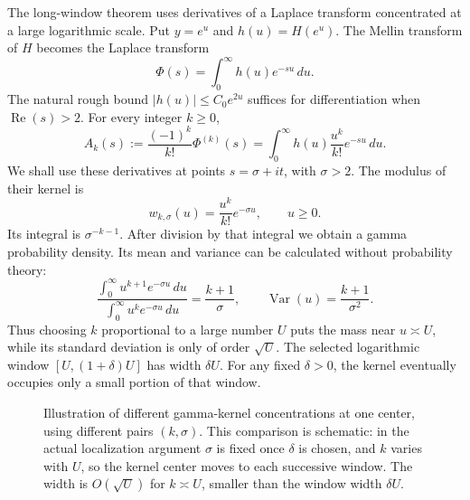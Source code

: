 \documentclass[11pt,openany,oneside]{scrbook}
\theoremstyle{definition}
\theoremstyle{remark}
\newcommand{\Rea}{\operatorname{Re}}
\begin{document}
The long-window theorem uses derivatives of a Laplace transform concentrated at a large logarithmic scale.  Put $y=e^u$ and $h(u)=H(e^u)$.  The Mellin transform of $H$ becomes the Laplace transform
\[
\Phi(s)=\int_0^\infty h(u)e^{-su}\,du.
\]
The natural rough bound $|h(u)|\le C_0e^{2u}$ suffices for differentiation when $\Rea(s)>2$.  For every integer $k\ge0$,
\begin{equation}\label{eq:normalized-derivative}
A_k(s):=\frac{(-1)^k}{k!}\Phi^{(k)}(s)
=\int_0^\infty h(u)\frac{u^k}{k!}e^{-su}\,du.
\end{equation}
We shall use these derivatives at points $s=\sigma+it$, with $\sigma>2$.  The modulus of their kernel is
\begin{equation}\label{eq:gamma-weight}
w_{k,\sigma}(u)=\frac{u^k}{k!}e^{-\sigma u},\qquad u\ge0.
\end{equation}
Its integral is $\sigma^{-k-1}$.  After division by that integral we obtain a gamma probability density.  Its mean and variance can be calculated without probability theory:
\[
\frac{\int_0^\infty u^{k+1}e^{-\sigma u}\,du}{\int_0^\infty u^{k}e^{-\sigma u}\,du}=\frac{k+1}{\sigma},\qquad
\operatorname{Var}(u)=\frac{k+1}{\sigma^2}.
\]
Thus choosing $k$ proportional to a large number $U$ puts the mass near $u\asymp U$, while its standard deviation is only of order $\sqrt U$.  The selected logarithmic window $[U,(1+\delta)U]$ has width $\delta U$.  For any fixed $\delta>0$, the kernel eventually occupies only a small portion of that window.

\begin{figure}[ht]
\centering
{}
\caption{Illustration of different gamma-kernel concentrations at one center, using different pairs $(k,\sigma)$. This comparison is schematic: in the actual localization argument $\sigma$ is fixed once $\delta$ is chosen, and $k$ varies with $U$, so the kernel center moves to each successive window. The width is $O(\sqrt U)$ for $k\asymp U$, smaller than the window width $\delta U$.}
\label{fig:gamma-window}
\end{figure}
\end{document}
